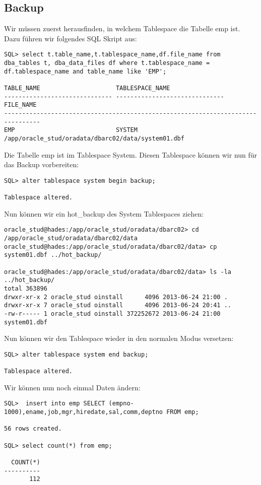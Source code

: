 \documentclass[11pt,a4paper,parskip=half]{scrartcl}
\begin{document}
\subsection{Backup}
Wir müssen zuerst herausfinden, in welchem Tablespace die Tabelle emp ist. Dazu führen wir folgendes SQL Skript aus:

\begin{lstlisting}
SQL> select t.table_name,t.tablespace_name,df.file_name from dba_tables t, dba_data_files df where t.tablespace_name = df.tablespace_name and table_name like 'EMP';

TABLE_NAME                     TABLESPACE_NAME
------------------------------ ------------------------------
FILE_NAME
--------------------------------------------------------------------------------
EMP                            SYSTEM
/app/oracle_stud/oradata/dbarc02/data/system01.dbf
\end{lstlisting}

Die Tabelle emp ist im Tablespace System. Diesen Tablespace können wir nun für das Backup vorbereiten:

\begin{lstlisting}
SQL> alter tablespace system begin backup;

Tablespace altered.
\end{lstlisting}

Nun können wir ein hot\_backup des System Tablespaces ziehen:
\begin{lstlisting}
oracle_stud@hades:/app/oracle_stud/oradata/dbarc02> cd /app/oracle_stud/oradata/dbarc02/data
oracle_stud@hades:/app/oracle_stud/oradata/dbarc02/data> cp system01.dbf ../hot_backup/

oracle_stud@hades:/app/oracle_stud/oradata/dbarc02/data> ls -la ../hot_backup/
total 363896
drwxr-xr-x 2 oracle_stud oinstall      4096 2013-06-24 21:00 .
drwxr-xr-x 7 oracle_stud oinstall      4096 2013-06-24 20:41 ..
-rw-r----- 1 oracle_stud oinstall 372252672 2013-06-24 21:00 system01.dbf
\end{lstlisting}

Nun können wir den Tablespace wieder in den normalen Modus versetzen:

\begin{lstlisting}
SQL> alter tablespace system end backup;

Tablespace altered.
\end{lstlisting}

Wir können nun noch einmal Daten ändern:

\begin{lstlisting}
SQL>  insert into emp SELECT (empno-1000),ename,job,mgr,hiredate,sal,comm,deptno FROM emp;

56 rows created.

SQL> select count(*) from emp;

  COUNT(*)
----------
       112
\end{lstlisting}
\end{document}
